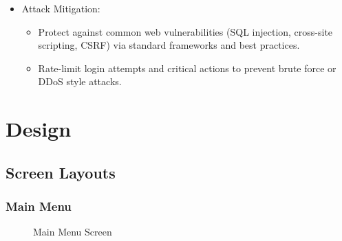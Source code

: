 \documentclass{article}
\begin{document}
\begin{enumerate}[label=\textbf{NFR\arabic*:}]
\begin{itemize}
        \item Attack Mitigation:
        \begin{itemize}
            \item Protect against common web vulnerabilities (SQL injection, cross-site scripting, CSRF) via standard frameworks and best practices.
            \item Rate-limit login attempts and critical actions to prevent brute force or DDoS style attacks.
        \end{itemize}
    \end{itemize}
\end{enumerate}

\section{Design}

\subsection{Screen Layouts}

\subsubsection{Main Menu}

\begin{figure}[H]
    \centering
    \caption{Main Menu Screen}
    \label{fig:main_menu}
\end{figure}
\end{document}
